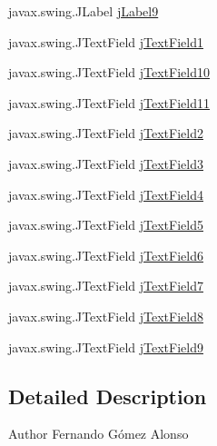 \begin{DoxyCompactItemize}
\item 
javax.\+swing.\+J\+Label \mbox{\hyperlink{class_interfaz_package_1_1_alta_libro_lectura_aee8f7c9887d32f72c8bd2e6e9808c524}{j\+Label9}}
\item 
javax.\+swing.\+J\+Text\+Field \mbox{\hyperlink{class_interfaz_package_1_1_alta_libro_lectura_aa23404c288ffab1e9e7e349e4336cc20}{j\+Text\+Field1}}
\item 
javax.\+swing.\+J\+Text\+Field \mbox{\hyperlink{class_interfaz_package_1_1_alta_libro_lectura_a937dab20a07279280f73c9b235398043}{j\+Text\+Field10}}
\item 
javax.\+swing.\+J\+Text\+Field \mbox{\hyperlink{class_interfaz_package_1_1_alta_libro_lectura_a0de30e644010e7a1c4aab54936597f18}{j\+Text\+Field11}}
\item 
javax.\+swing.\+J\+Text\+Field \mbox{\hyperlink{class_interfaz_package_1_1_alta_libro_lectura_a27642fe481c01e307cab4843cc5d86b8}{j\+Text\+Field2}}
\item 
javax.\+swing.\+J\+Text\+Field \mbox{\hyperlink{class_interfaz_package_1_1_alta_libro_lectura_a51e44050eaeb982b64b831c47c61302f}{j\+Text\+Field3}}
\item 
javax.\+swing.\+J\+Text\+Field \mbox{\hyperlink{class_interfaz_package_1_1_alta_libro_lectura_a9270f2ef1de5103cae58610ae6f84a4e}{j\+Text\+Field4}}
\item 
javax.\+swing.\+J\+Text\+Field \mbox{\hyperlink{class_interfaz_package_1_1_alta_libro_lectura_a9780c336f84357f6c171a8ccd8f8a94b}{j\+Text\+Field5}}
\item 
javax.\+swing.\+J\+Text\+Field \mbox{\hyperlink{class_interfaz_package_1_1_alta_libro_lectura_a064748cc16381a3773e64995629181b2}{j\+Text\+Field6}}
\item 
javax.\+swing.\+J\+Text\+Field \mbox{\hyperlink{class_interfaz_package_1_1_alta_libro_lectura_a36a5981735d729d529ba7e20cb9182da}{j\+Text\+Field7}}
\item 
javax.\+swing.\+J\+Text\+Field \mbox{\hyperlink{class_interfaz_package_1_1_alta_libro_lectura_a3d4c846fbcd44478ef1bb950c38d6f57}{j\+Text\+Field8}}
\item 
javax.\+swing.\+J\+Text\+Field \mbox{\hyperlink{class_interfaz_package_1_1_alta_libro_lectura_aac3e23145bb542e8d96109c1ab458fa1}{j\+Text\+Field9}}
\end{DoxyCompactItemize}


\subsection{Detailed Description}
\begin{DoxyAuthor}{Author}
Fernando Gómez Alonso 
\end{DoxyAuthor}


